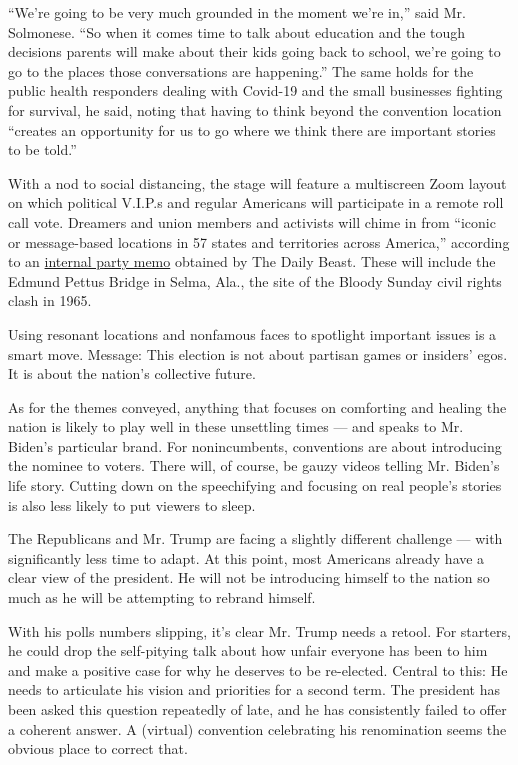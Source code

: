 ``We're going to be very much grounded in the moment we're in,'' said
Mr. Solmonese. ``So when it comes time to talk about education and the
tough decisions parents will make about their kids going back to school,
we're going to go to the places those conversations are happening.'' The
same holds for the public health responders dealing with Covid-19 and
the small businesses fighting for survival, he said, noting that having
to think beyond the convention location ``creates an opportunity for us
to go where we think there are important stories to be told.''

With a nod to social distancing, the stage will feature a multiscreen
Zoom layout on which political V.I.P.s and regular Americans will
participate in a remote roll call vote. Dreamers and union members and
activists will chime in from ``iconic or message-based locations in 57
states and territories across America,'' according to an
\href{https://www.thedailybeast.com/leaked-documents-show-the-dncs-plans-for-a-reimagined-convention?ref=wrap}{internal
party memo} obtained by The Daily Beast. These will include the Edmund
Pettus Bridge in Selma, Ala., the site of the Bloody Sunday civil rights
clash in 1965.

Using resonant locations and nonfamous faces to spotlight important
issues is a smart move. Message: This election is not about partisan
games or insiders' egos. It is about the nation's collective future.

As for the themes conveyed, anything that focuses on comforting and
healing the nation is likely to play well in these unsettling times ---
and speaks to Mr. Biden's particular brand. For nonincumbents,
conventions are about introducing the nominee to voters. There will, of
course, be gauzy videos telling Mr. Biden's life story. Cutting down on
the speechifying and focusing on real people's stories is also less
likely to put viewers to sleep.

The Republicans and Mr. Trump are facing a slightly different challenge
--- with significantly less time to adapt. At this point, most Americans
already have a clear view of the president. He will not be introducing
himself to the nation so much as he will be attempting to rebrand
himself.

With his polls numbers slipping, it's clear Mr. Trump needs a retool.
For starters, he could drop the self-pitying talk about how unfair
everyone has been to him and make a positive case for why he deserves to
be re-elected. Central to this: He needs to articulate his vision and
priorities for a second term. The president has been asked this question
repeatedly of late, and he has consistently failed to offer a coherent
answer. A (virtual) convention celebrating his renomination seems the
obvious place to correct that.

